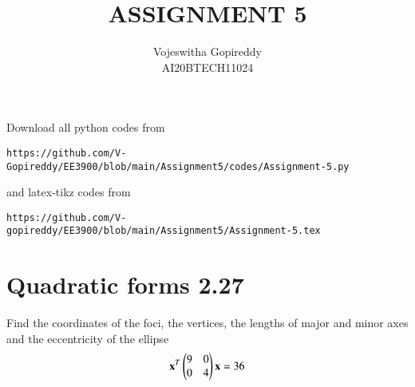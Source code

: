 \documentclass[journal,12pt,twocolumn]{IEEEtran}
\begin{document}
     \def\centbox#1{\makebox[0in]{#1}}
     \def\topbox#1{\raisebox{-\baselineskip}[0in][0in]{#1}}
     \def\midbox#1{\raisebox{-0.5\baselineskip}[0in][0in]{#1}}
\vspace{3cm}
\title{ASSIGNMENT 5}
\author{Vojeswitha Gopireddy \\ AI20BTECH11024}
\maketitle
\newpage
\bigskip
\renewcommand{\thefigure}{\theenumi}
\renewcommand{\thetable}{\theenumi}
Download all python codes from 
\begin{lstlisting}
https://github.com/V-Gopireddy/EE3900/blob/main/Assignment5/codes/Assignment-5.py
\end{lstlisting}
%
and latex-tikz codes from 
%
\begin{lstlisting}
https://github.com/V-gopireddy/EE3900/blob/main/Assignment5/Assignment-5.tex
\end{lstlisting}
\section{Quadratic forms 2.27}
Find the coordinates of the foci, the vertices,
the lengths of major and minor axes and the
eccentricity of the ellipse
\begin{align}
  \mathbf{x}^T\begin{pmatrix}9&0\\0&4\end{pmatrix}\mathbf{x}=36   
\end{align}
%
\end{document}
